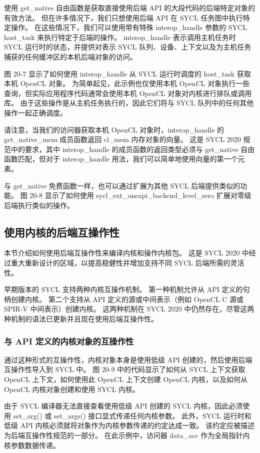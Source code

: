 使用 get\_native 自由函数是获取直接使用后端 API 的大段代码的后端特定对象的有效方法。 但在许多情况下，我们只想使用后端 API 在 SYCL 任务图中执行特定操作。 在这些情况下，我们可以使用带有特殊 interop\_handle 参数的 SYCL host\_task 来执行特定于后端的操作。 interop\_handle 表示调用主机任务时 SYCL 运行时的状态，并提供对表示 SYCL 队列、设备、上下文以及为主机任务捕获的任何缓冲区的本机后端对象的访问。

图 20-7 显示了如何使用 interop\_handle 从 SYCL 运行时调度的 host\_task 获取本机 OpenCL 对象。 为简单起见，此示例也仅使用本机 OpenCL 对象执行一些查询，但实际应用程序代码通常会使用本机 OpenCL 对象对内核进行排队或调用库。 由于这些操作是从主机任务执行的，因此它们将与 SYCL 队列中的任何其他操作一起正确调度。

请注意，当我们的访问器获取本机 OpenCL 对象时，interop\_handle 的 get\_native\_mem 成员函数返回 cl\_mem 内存对象的向量。 这是 SYCL 2020 规范中的要求，其中 interop\_handle 的成员函数的返回类型必须与 get\_native 自由函数匹配，但对于 interop\_handle 用法，我们可以简单地使用向量的第一个元素。

与 get\_native 免费函数一样，也可以通过扩展为其他 SYCL 后端提供类似的功能。 图 20-8 显示了如何使用 sycl\_ext\_oneapi\_backend\_level\_zero 扩展对零级后端执行类似的操作。

\subsection{使用内核的后端互操作性}
本节介绍如何使用后端互操作性来编译内核和操作内核包。 这是 SYCL 2020 中经过重大重新设计的区域，以提高稳健性并增加支持不同 SYCL 后端所需的灵活性。

早期版本的 SYCL 支持两种内核互操作机制。 第一种机制允许从 API 定义的句柄创建内核。 第二个支持从 API 定义的源或中间表示（例如 OpenCL C 源或 SPIR-V 中间表示）创建内核。 这两种机制在 SYCL 2020 中仍然存在，尽管这两种机制的语法已更新并且现在使用后端互操作性。

\subsubsection{与 API 定义的内核对象的互操作性}
通过这种形式的互操作性，内核对象本身是使用低级 API 创建的，然后使用后端互操作性导入到 SYCL 中。 图 20-9 中的代码显示了如何从 SYCL 上下文获取 OpenCL 上下文，如何使用此 OpenCL 上下文创建 OpenCL 内核，以及如何从 OpenCL 内核对象创建和使用 SYCL 内核。

由于 SYCL 编译器无法直接查看使用低级 API 创建的 SYCL 内核，因此必须使用 set\_arg() 或 set\_args() 接口显式传递任何内核参数。 此外，SYCL 运行时和低级 API 内核必须就将对象作为内核参数传递的约定达成一致。 该约定应被描述为后端互操作性规范的一部分。 在此示例中，访问器 data\_acc 作为全局指针内核参数数据传递。

